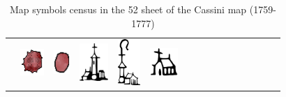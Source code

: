 \documentclass[portrait,a0]{sciposter}
\begin{document}
\begin{minipage}[b]{\textwidth}
\begin{multicols}{3}
    \footnotesize
    \begin{table}[]
      \begin{center}
        \captionsetup{type=table}
        \caption{Map symbols census in the 52 sheet of the Cassini map (1759-1777)}\label{tab:symbols}
        \setcellgapes{1pt}
        \begin{tabular}{cccccccccccccccc}
          &
          \includegraphics[height=28pt]{gfx/ville_couleur.png}&
          \includegraphics[height=25pt]{gfx/bourg_couleur.png}&
          \includegraphics[height=40pt]{gfx/village.pdf}&
          \includegraphics[height=49pt]{gfx/abbaye.pdf}&
          \includegraphics[height=30pt]{gfx/chapelle.pdf}&

\end{tabular}
\end{center}
\end{table}
\end{multicols}
\end{minipage}
\end{document}
